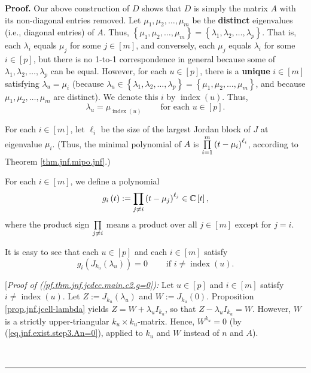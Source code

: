 \documentclass[numbers=enddot,12pt,final,onecolumn,notitlepage]{scrartcl}%
\numberwithin{exer}{subsection}
\theoremstyle{definition}
\newenvironment{proof}[1][Proof]{\noindent\textbf{#1.} }{\ \rule{0.5em}{0.5em}}
\let\prodnonlimits\prod
\renewcommand{\prod}{\prodnonlimits\limits}
\newenvironment{noncompile}{}{}
\begin{document}
\begin{proof}
\begin{noncompile}
Our above construction of $D$ shows that $D$ is simply the matrix $A$ with its
non-diagonal entries removed. Let $\mu_{1},\mu_{2},\ldots,\mu_{m}$ be the
\textbf{distinct} eigenvalues (i.e., diagonal entries) of $A$. Thus, $\left\{
\mu_{1},\mu_{2},\ldots,\mu_{m}\right\}  =\left\{  \lambda_{1},\lambda
_{2},\ldots,\lambda_{p}\right\}  $. That is, each $\lambda_{i}$ equals
$\mu_{j}$ for some $j\in\left[  m\right]  $, and conversely, each $\mu_{j}$
equals $\lambda_{i}$ for some $i\in\left[  p\right]  $, but there is no 1-to-1
correspondence in general because some of $\lambda_{1},\lambda_{2}%
,\ldots,\lambda_{p}$ can be equal. However, for each $u\in\left[  p\right]  $,
there is a \textbf{unique} $i\in\left[  m\right]  $ satisfying $\lambda
_{u}=\mu_{i}$ (because $\lambda_{u}\in\left\{  \lambda_{1},\lambda_{2}%
,\ldots,\lambda_{p}\right\}  =\left\{  \mu_{1},\mu_{2},\ldots,\mu_{m}\right\}
$, and because $\mu_{1},\mu_{2},\ldots,\mu_{m}$ are distinct). We denote this
$i$ by $\operatorname*{index}\left(  u\right)  $. Thus,
\begin{equation}
\lambda_{u}=\mu_{\operatorname*{index}\left(  u\right)  }%
\ \ \ \ \ \ \ \ \ \ \text{for each }u\in\left[  p\right]  .
\label{pf.thm.jnf.jcdec.main.c2.index}%
\end{equation}


For each $i\in\left[  m\right]  $, let $\ell_{i}$ be the size of the largest
Jordan block of $J$ at eigenvalue $\mu_{i}$. (Thus, the minimal polynomial of
$A$ is $\prod\limits_{i=1}^{m}\left(  t-\mu_{i}\right)  ^{\ell_{i}}$,
according to Theorem \ref{thm.jnf.mipo.jnf}.)

For each $i\in\left[  m\right]  $, we define a polynomial%
\begin{equation}
g_{i}\left(  t\right)  :=\prod\limits_{j\neq i}\left(  t-\mu_{j}\right)
^{\ell_{j}}\in\mathbb{C}\left[  t\right]
,\label{pf.thm.jnf.jcdec.main.c2.g-def}%
\end{equation}
where the product sign $\prod\limits_{j\neq i}$ means a product over all
$j\in\left[  m\right]  $ except for $j=i$.

It is easy to see that each $u\in\left[  p\right]  $ and each $i\in\left[
m\right]  $ satisfy%
\begin{equation}
g_{i}\left(  J_{k_{u}}\left(  \lambda_{u}\right)  \right)
=0\ \ \ \ \ \ \ \ \ \ \text{if }i\neq\operatorname*{index}\left(  u\right)  .
\label{pf.thm.jnf.jcdec.main.c2.g=0}%
\end{equation}


[\textit{Proof of (\ref{pf.thm.jnf.jcdec.main.c2.g=0}):} Let $u\in\left[
p\right]  $ and $i\in\left[  m\right]  $ satisfy $i\neq\operatorname*{index}%
\left(  u\right)  $. Let $Z:=J_{k_{u}}\left(  \lambda_{u}\right)  $ and
$W:=J_{k_{u}}\left(  0\right)  $. Proposition \ref{prop.jnf.jcell-lambda}
yields $Z=W+\lambda_{u}I_{k_{u}}$, so that $Z-\lambda_{u}I_{k_{u}}=W$.
However, $W$ is a strictly upper-triangular $k_{u}\times k_{u}$-matrix. Hence,
$W^{k_{u}}=0$ (by (\ref{eq.jnf.exist.step3.An=0}), applied to $k_{u}$ and $W$
instead of $n$ and $A$).


\end{noncompile}
\end{proof}
\end{document}
